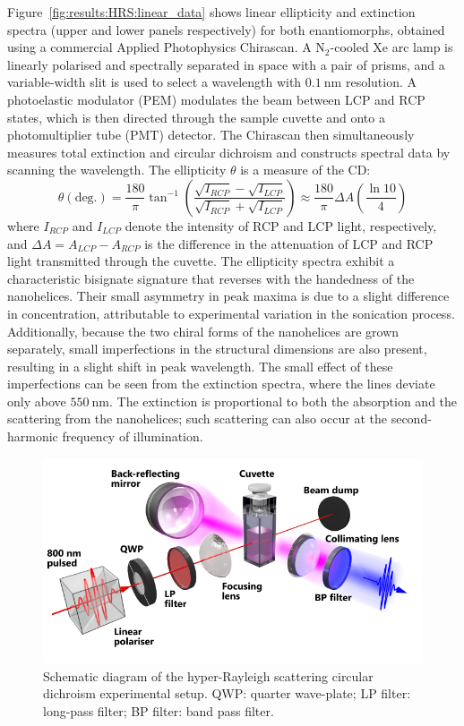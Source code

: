 Figure~\ref{fig:results:HRS:linear_data} shows linear ellipticity and extinction spectra (upper and lower panels respectively) for both enantiomorphs, obtained using a commercial Applied Photophysics Chirascan. A $\text{N}_2$-cooled Xe arc lamp is linearly polarised and spectrally separated in space with a pair of prisms, and a variable-width slit is used to select a wavelength with $\SI{0.1}{\nano\m}$ resolution. A photoelastic modulator (PEM) modulates the beam between LCP and RCP states, which is then directed through the sample cuvette and onto a photomultiplier tube (PMT) detector. The Chirascan then simultaneously measures total extinction and circular dichroism and constructs spectral data by scanning the wavelength.
The ellipticity $\theta$ is a measure of the CD:
\begin{equation}
    \theta (\text{deg.}) = \frac{180}{\pi} \tan^{-1}\left( \frac{\sqrt{I_{RCP}} - \sqrt{I_{LCP}}}{\sqrt{I_{RCP}} + \sqrt{I_{LCP}}} \right) \approx \frac{180}{\pi} \Delta A \left( \frac{\ln 10}{4} \right)
\end{equation}
where $I_{RCP}$ and $I_{LCP}$ denote the intensity of RCP and LCP light, respectively, and $\Delta A = A_{LCP} - A_{RCP}$ is the difference in the attenuation of LCP and RCP light transmitted through the cuvette. 
The ellipticity spectra exhibit a characteristic bisignate signature that reverses with the handedness of the nanohelices. Their small asymmetry in peak maxima is due to a slight difference in concentration, attributable to experimental variation in the sonication process. Additionally, because the two chiral forms of the nanohelices are grown separately, small imperfections in the structural dimensions are also present, resulting in a slight shift in peak wavelength. The small effect of these imperfections can be seen from the extinction spectra, where the lines deviate only above $\SI{550}{\nano\m}$. The extinction is proportional to both the absorption and the scattering from the nanohelices; such scattering can also occur at the second-harmonic frequency of illumination. 

\begin{figure}[htb!]	
    \centering	
    \includegraphics[scale=1]{./figures/results/HRS/experiment_schematic.pdf}
    \caption{\label{fig:results:HRS:experiment_schematic}
    Schematic diagram of the hyper-Rayleigh scattering circular dichroism experimental setup. QWP: quarter wave-plate; LP filter: long-pass filter; BP filter: band pass filter. }	
\end{figure}

